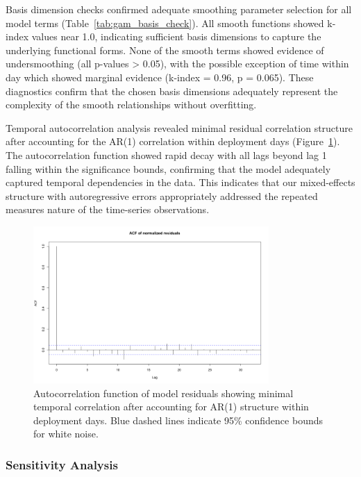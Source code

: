 Basis dimension checks confirmed adequate smoothing parameter selection for all model terms (Table~\ref{tab:gam_basis_check}). All smooth functions showed k-index values near 1.0, indicating sufficient basis dimensions to capture the underlying functional forms. None of the smooth terms showed evidence of undersmoothing (all p-values > 0.05), with the possible exception of time within day which showed marginal evidence (k-index = 0.96, p = 0.065). These diagnostics confirm that the chosen basis dimensions adequately represent the complexity of the smooth relationships without overfitting.



Temporal autocorrelation analysis revealed minimal residual correlation structure after accounting for the AR(1) correlation within deployment days (Figure~\ref{fig:acf_diagnostics}). The autocorrelation function showed rapid decay with all lags beyond lag 1 falling within the significance bounds, confirming that the model adequately captured temporal dependencies in the data. This indicates that our mixed-effects structure with autoregressive errors appropriately addressed the repeated measures nature of the time-series observations.

\begin{figure}[htbp]
    \centering
    \includegraphics[width=0.8\textwidth]{supplemental/results/30_min/figures/diag_acf.png}
    \caption{Autocorrelation function of model residuals showing minimal temporal correlation after accounting for AR(1) structure within deployment days. Blue dashed lines indicate 95\% confidence bounds for white noise.}
    \label{fig:acf_diagnostics}
\end{figure} 

\subsubsection{Sensitivity Analysis}

